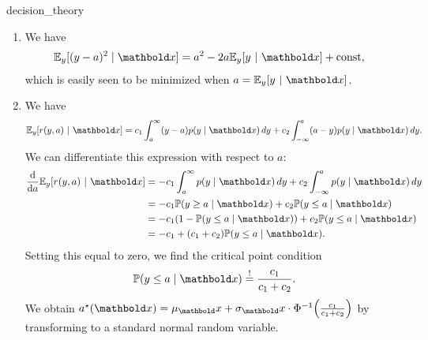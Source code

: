 \begin{solution}{decision_theory}
  \begin{enumerate}[beginpenalty=10000]
    \item We have \begin{align*}
      \E*[y]{[(y - a)^2 \mid \vx]} &= a^2 - 2 a \E[y]{y}[\vx] + \const,
    \end{align*} which is easily seen to be minimized when $a = \E[y]{y}[\vx]$.

    \item We have \begin{align*}
      \E[y]{r(y, a)}[\vx] = c_1 \int_a^\infty (y-a) p(y \mid \vx) \,d y + c_2 \int_{-\infty}^a (a-y) p(y \mid \vx) \,d y.
    \end{align*}
    We can differentiate this expression with respect to $a$: \begin{align*}
      \odv{}{a} \E[y]{r(y, a)}[\vx] &= - c_1 \int_a^\infty p(y \mid \vx) \,d y + c_2 \int_{-\infty}^a p(y \mid \vx) \,d y \\
      &= - c_1 \Pr{y \geq a \mid \vx} + c_2 \Pr{y \leq a \mid \vx} \\
      &= - c_1 (1 - \Pr{y \leq a \mid \vx}) + c_2 \Pr{y \leq a \mid \vx} \\
      &= - c_1 + (c_1 + c_2) \Pr{y \leq a \mid \vx}.
    \end{align*}
    Setting this equal to zero, we find the critical point condition \begin{align*}
      \Pr{y \leq a \mid \vx} \overset{!}{=} \frac{c_1}{c_1 + c_2}.
    \end{align*}
    We obtain $\opt{a}(\vx) = \mu_\vx + \sigma_\vx \cdot \inv{\Phi}\parentheses*{\frac{c_1}{c_1 + c_2}}$ by transforming to a standard normal random variable.
  \end{enumerate}
\end{solution}

\section*{}

